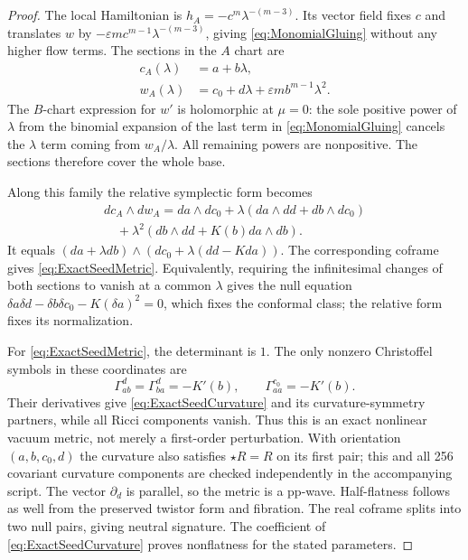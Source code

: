 \documentclass[aps,prd,reprint,nofootinbib,superscriptaddress]{revtex4-2}
\theoremstyle{definition}
\theoremstyle{remark}
\newcommand{\eps}{\varepsilon}
\begin{document}
\begin{proof}
The local Hamiltonian is $\widehat h_A=-c^m\lambda^{-(m-3)}$. Its vector field fixes $c$ and translates $w$ by $-\eps m c^{m-1}\lambda^{-(m-3)}$, giving \eqref{eq:MonomialGluing} without any higher flow terms. The sections in the $A$ chart are
\begin{align}
c_A(\lambda)&=a+b\lambda,\nonumber\\
w_A(\lambda)&=c_0+d\lambda+\eps m b^{m-1}\lambda^2.
\label{eq:ExactSeedSections}
\end{align}
The $B$-chart expression for $w'$ is holomorphic at $\mu=0$: the sole positive power of $\lambda$ from the binomial expansion of the last term in \eqref{eq:MonomialGluing} cancels the $\lambda$ term coming from $w_A/\lambda$. All remaining powers are nonpositive. The sections therefore cover the whole base.

Along this family the relative symplectic form becomes
\begin{multline}
d c_A\wedge d w_A
=da\wedge dc_0+\lambda(da\wedge dd+db\wedge dc_0)\\
\quad+\lambda^2(db\wedge dd+K(b)da\wedge db).
\label{eq:ExactSeedForms}
\end{multline}
It equals $(da+\lambda db)\wedge(dc_0+\lambda(dd-Kda))$. The corresponding coframe gives \eqref{eq:ExactSeedMetric}. Equivalently, requiring the infinitesimal changes of both sections to vanish at a common $\lambda$ gives the null equation
$\delta a\delta d-\delta b\delta c_0-K(\delta a)^2=0$, which fixes the conformal class; the relative form fixes its normalization.

For \eqref{eq:ExactSeedMetric}, the determinant is $1$. The only nonzero Christoffel symbols in these coordinates are
\begin{equation}
\Gamma^{d}_{ab}=\Gamma^{d}_{ba}=-K'(b),
\qquad \Gamma^{c_0}_{aa}=-K'(b).
\end{equation}
Their derivatives give \eqref{eq:ExactSeedCurvature} and its curvature-symmetry partners, while all Ricci components vanish. Thus this is an exact nonlinear vacuum metric, not merely a first-order perturbation. With orientation $(a,b,c_0,d)$ the curvature also satisfies $\star R=R$ on its first pair; this and all 256 covariant curvature components are checked independently in the accompanying script. The vector $\partial_d$ is parallel, so the metric is a pp-wave. Half-flatness follows as well from the preserved twistor form and fibration. The real coframe splits into two null pairs, giving neutral signature. The coefficient of \eqref{eq:ExactSeedCurvature} proves nonflatness for the stated parameters.
\end{proof}
\end{document}
